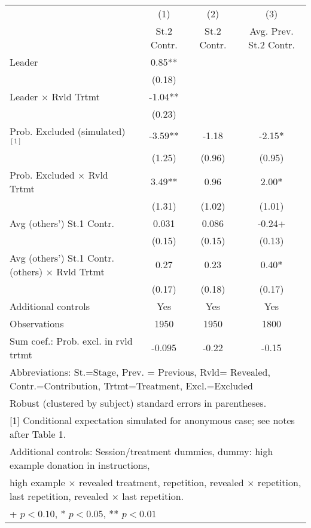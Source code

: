 {
\def\sym#1{\ifmmode^{#1}\else\(^{#1}\)\fi}
\begin{tabular}{l*{3}{c}}
\hline
                &\multicolumn{1}{c}{(1)}&\multicolumn{1}{c}{(2)}&\multicolumn{1}{c}{(3)}\\
                &\multicolumn{1}{c}{St.2 Contr.}&\multicolumn{1}{c}{St.2 Contr.}&\multicolumn{1}{c}{Avg. Prev. St.2 Contr.}\\
\hline
Leader          &     0.85**&           &           \\
                &   (0.18)  &           &           \\
Leader $\times$ Rvld Trtmt&    -1.04**&           &           \\
                &   (0.23)  &           &           \\
Prob. Excluded (simulated)$^{[1]}$&    -3.59**&    -1.18  &    -2.15* \\
                &   (1.25)  &   (0.96)  &   (0.95)  \\
Prob. Excluded $\times$ Rvld Trtmt&     3.49**&     0.96  &     2.00* \\
                &   (1.31)  &   (1.02)  &   (1.01)  \\
Avg (others') St.1 Contr.&    0.031  &    0.086  &    -0.24+ \\
                &   (0.15)  &   (0.15)  &   (0.13)  \\
Avg (others') St.1 Contr. (others) $\times$ Rvld Trtmt&     0.27  &     0.23  &     0.40* \\
                &   (0.17)  &   (0.18)  &   (0.17)  \\
Additional controls &      Yes  &      Yes  &      Yes  \\
\hline
Observations    &     1950  &     1950  &     1800  \\
Sum coef.: Prob. excl. in rvld trtmt&    -0.095  &     -0.22  &     -0.15  \\
\hline

\multicolumn{4}{l}{\footnotesize Abbreviations:  St.=Stage, Prev. = Previous, Rvld= Revealed, Contr.=Contribution, Trtmt=Treatment, Excl.=Excluded}\\
\multicolumn{4}{l}{\footnotesize Robust (clustered by subject) standard errors in parentheses.}\\
\multicolumn{4}{l}{\footnotesize [1] Conditional expectation simulated for anonymous case; see notes after Table 1.}\\
\multicolumn{4}{l}{\footnotesize Additional controls: Session/treatment dummies, dummy: high example donation in instructions,}\\
\multicolumn{4}{l}{\footnotesize high example $\times$ revealed treatment, repetition, revealed $\times$ repetition, last repetition, revealed $\times$ last repetition.}\\
\multicolumn{4}{l}{\footnotesize + $p<0.10$, * $p<0.05$, ** $p<0.01$}\\
\end{tabular}
}
